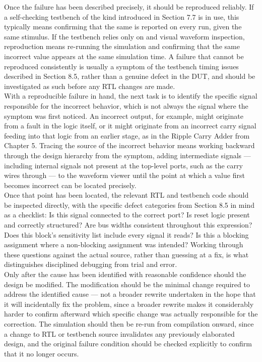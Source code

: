 Once the failure has been described precisely, it should be reproduced reliably. If a self-checking testbench of the kind introduced in Section 7.7 is in use, this typically means confirming that the same  is reported on every run, given the same stimulus. If the testbench relies only on  and visual waveform inspection, reproduction means re-running the simulation and confirming that the same incorrect value appears at the same simulation time. A failure that cannot be reproduced consistently is usually a symptom of the testbench timing issues described in Section 8.5, rather than a genuine defect in the DUT, and should be investigated as such before any RTL changes are made.\\

With a reproducible failure in hand, the next task is to identify the specific signal responsible for the incorrect behavior, which is not always the signal where the symptom was first noticed. An incorrect  output, for example, might originate from a fault in the  logic itself, or it might originate from an incorrect carry signal feeding into that logic from an earlier stage, as in the Ripple Carry Adder from Chapter 5. Tracing the source of the incorrect behavior means working backward through the design hierarchy from the symptom, adding intermediate signals --- including internal signals not present at the top-level ports, such as the carry wires  through  --- to the waveform viewer until the point at which a value first becomes incorrect can be located precisely.\\

Once that point has been located, the relevant RTL and testbench code should be inspected directly, with the specific defect categories from Section 8.5 in mind as a checklist: Is this signal connected to the correct port? Is reset logic present and correctly structured? Are bus widths consistent throughout this expression? Does this  block's sensitivity list include every signal it reads? Is this a blocking assignment where a non-blocking assignment was intended? Working through these questions against the actual source, rather than guessing at a fix, is what distinguishes disciplined debugging from trial and error.\\

Only after the cause has been identified with reasonable confidence should the design be modified. The modification should be the minimal change required to address the identified cause --- not a broader rewrite undertaken in the hope that it will incidentally fix the problem, since a broader rewrite makes it considerably harder to confirm afterward which specific change was actually responsible for the correction. The simulation should then be re-run from compilation onward, since a change to RTL or testbench source invalidates any previously elaborated design, and the original failure condition should be checked explicitly to confirm that it no longer occurs.\\

